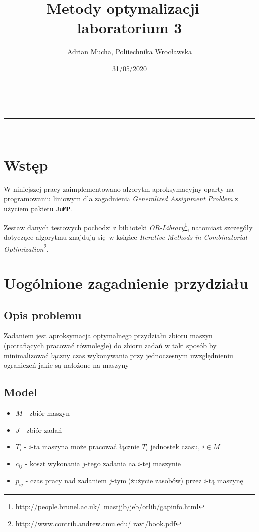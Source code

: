 \documentclass[a4paper,11pt]{article}
\makeatletter
\newcommand{\linia}{\rule{\linewidth}{0.5pt}}
\theoremstyle{mytheor}
\renewcommand{\maketitle}{
\begin{center}
\vspace{2ex}
{\huge \textsc{\@title}}
\vspace{1ex}
\\
\linia\\
\@author \hfill \@date
\vspace{4ex}
\end{center}
}
\makeatother
\begin{document}
\title{Metody optymalizacji – laboratorium 3}

\author{Adrian Mucha, Politechnika Wrocławska}

\date{31/05/2020}

\maketitle

\section*{Wstęp}
W niniejszej pracy zaimplementowano algorytm aproksymacyjny oparty na programowaniu liniowym dla zagadnienia \textit{Generalized Assignment Problem} z użyciem pakietu \texttt{JuMP}.

Zestaw danych testowych pochodzi z biblioteki \textit{OR-Library}\footnote{http://people.brunel.ac.uk/~mastjjb/jeb/orlib/gapinfo.html}, natomiast szczegóły dotyczące algorytmu znajdują się w książce \textit{Iterative Methods in Combinatorial Optimization}\footnote{http://www.contrib.andrew.cmu.edu/ ravi/book.pdf}.

\section*{Uogólnione zagadnienie przydziału}
\subsection*{Opis problemu}
Zadaniem jest aproksymacja optymalnego przydziału zbioru maszyn (potrafiących pracować równolegle) do zbioru zadań w taki sposób by minimalizować łączny czas wykonywania przy jednoczesnym uwzględnieniu ograniczeń jakie są nałożone na maszyny.

\subsection*{Model}
\begin{itemize}
    \item $M$ - zbiór maszyn
    \item $J$ - zbiór zadań
    \item $T_i$ - $i$-ta maszyna może pracować łącznie $T_i$ jednostek czasu, $i \in M$
    \item $c_{ij}$ - koszt wykonania $j$-tego zadania na $i$-tej maszynie
    \item $p_{ij}$ - czas pracy nad zadaniem $j$-tym (żużycie zasobów) przez $i$-tą maszynę
\end{itemize}
\end{document}
